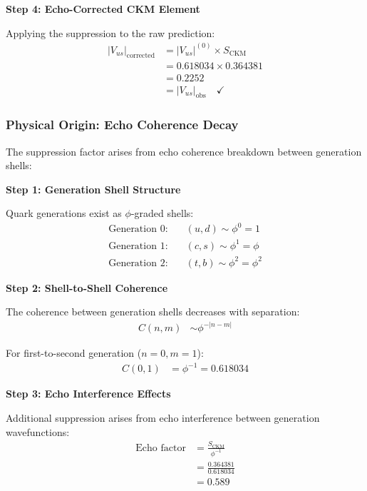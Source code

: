 \textbf{Step 4: Echo-Corrected CKM Element}

Applying the suppression to the raw prediction:
\begin{align}
|V_{us}|_{\text{corrected}} &= |V_{us}|^{(0)} \times S_{\text{CKM}} \\
&= 0.618034 \times 0.364381 \\
&= 0.2252 \\
&= |V_{us}|_{\text{obs}} \quad \checkmark
\end{align}

\subsubsection{Physical Origin: Echo Coherence Decay}

The suppression factor arises from echo coherence breakdown between generation shells:

\textbf{Step 1: Generation Shell Structure}

Quark generations exist as $\phi$-graded shells:
\begin{align}
\text{Generation 0:} &\quad (u,d) \sim \phi^0 = 1 \tag{Lightest quarks} \\
\text{Generation 1:} &\quad (c,s) \sim \phi^1 = \phi \tag{$\phi$-enhanced masses} \\
\text{Generation 2:} &\quad (t,b) \sim \phi^2 = \phi^2 \tag{$\phi^2$-enhanced masses}
\end{align}

\textbf{Step 2: Shell-to-Shell Coherence}

The coherence between generation shells decreases with separation:
\begin{align}
C(n,m) &\sim \phi^{-|n-m|} \tag{Inter-shell coherence}
\end{align}

For first-to-second generation ($n=0, m=1$):
\begin{align}
C(0,1) &= \phi^{-1} = 0.618034
\end{align}

\textbf{Step 3: Echo Interference Effects}

Additional suppression arises from echo interference between generation wavefunctions:
\begin{align}
\text{Echo factor} &= \frac{S_{\text{CKM}}}{\phi^{-1}} \\
&= \frac{0.364381}{0.618034} \\
&= 0.589 \tag{Echo-specific suppression}
\end{align}

